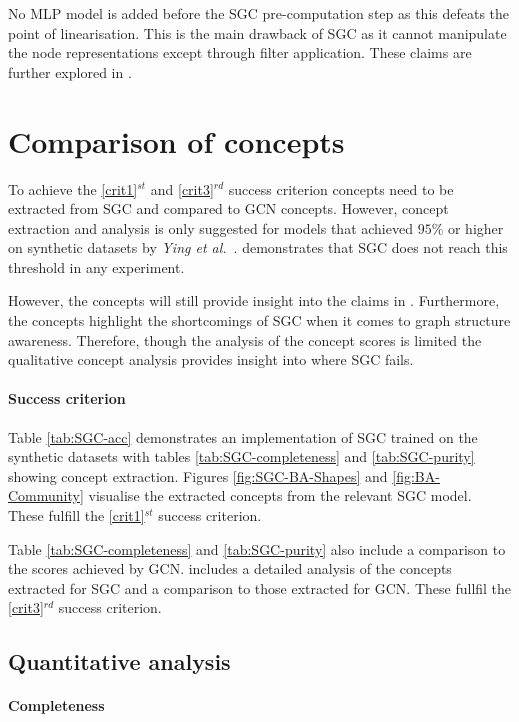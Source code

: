 No MLP model is added before the SGC pre-computation step as this defeats the point of linearisation.
This is the main drawback of SGC as it cannot manipulate the node representations except through filter application.
These claims are further explored in .

\section{Comparison of concepts}
\label{sec:comp-concept}

To achieve the \ref{crit1}$^{st}$ and \ref{crit3}$^{rd}$ success criterion concepts need to be extracted from SGC and compared to GCN concepts.
However, concept extraction and analysis is only suggested for models that achieved $95$\% or higher on synthetic datasets by \textit{Ying et al.}~\cite{ying2019gnnexplainer}.
 demonstrates that SGC does not reach this threshold in any experiment.

However, the concepts will still provide insight into the claims in .
Furthermore, the concepts highlight the shortcomings of SGC when it comes to graph structure awareness.
Therefore, though the analysis of the concept scores is limited the qualitative concept analysis provides insight into where SGC fails.

\paragraph{Success criterion}
Table \ref{tab:SGC-acc} demonstrates an implementation of SGC trained on the synthetic datasets with tables \ref{tab:SGC-completeness} and \ref{tab:SGC-purity} showing concept extraction.
Figures \ref{fig:SGC-BA-Shapes} and \ref{fig:BA-Community} visualise the extracted concepts from the relevant SGC model. These fulfill the \ref{crit1}$^{st}$ success criterion.

Table \ref{tab:SGC-completeness} and \ref{tab:SGC-purity} also include a comparison to the scores achieved by GCN.
 includes a detailed analysis of the concepts extracted for SGC and a comparison to those extracted for GCN.
These fullfil the \ref{crit3}$^{rd}$ success criterion.

\subsection{Quantitative analysis}
\label{sec:quant}
\paragraph{Completeness}


